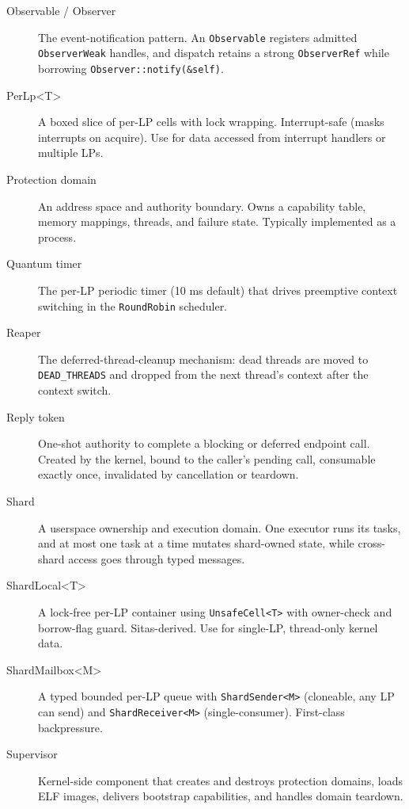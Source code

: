 \begin{description}
    \item[Observable / Observer] The event-notification pattern. An
        \texttt{Observable} registers admitted \texttt{ObserverWeak} handles, and
        dispatch retains a strong \texttt{ObserverRef} while borrowing
        \texttt{Observer::notify(\&self)}.

    \item[PerLp<T>] A boxed slice of per-LP cells with lock wrapping.
        Interrupt-safe (masks interrupts on acquire). Use for data accessed
        from interrupt handlers or multiple LPs.

    \item[Protection domain] An address space and authority boundary. Owns a
        capability table, memory mappings, threads, and failure state. Typically
        implemented as a process.

    \item[Quantum timer] The per-LP periodic timer (10 ms default) that drives
        preemptive context switching in the \texttt{RoundRobin} scheduler.

    \item[Reaper] The deferred-thread-cleanup mechanism: dead threads are
        moved to \texttt{DEAD\_THREADS} and dropped from the next thread's
        context after the context switch.

    \item[Reply token] One-shot authority to complete a blocking or deferred
        endpoint call. Created by the kernel, bound to the caller's pending
        call, consumable exactly once, invalidated by cancellation or teardown.

    \item[Shard] A userspace ownership and execution domain. One executor runs
        its tasks, and at most one task at a time mutates shard-owned state, while
        cross-shard access goes through typed messages.

    \item[ShardLocal<T>] A lock-free per-LP container using
        \texttt{UnsafeCell<T>} with owner-check and borrow-flag guard.
        Sitas-derived. Use for single-LP, thread-only kernel data.

    \item[ShardMailbox<M>] A typed bounded per-LP queue with
        \texttt{ShardSender<M>} (cloneable, any LP can send) and
        \texttt{ShardReceiver<M>} (single-consumer). First-class backpressure.

    \item[Supervisor] Kernel-side component that creates and destroys
        protection domains, loads ELF images, delivers bootstrap capabilities,
        and handles domain teardown.


\end{description}
